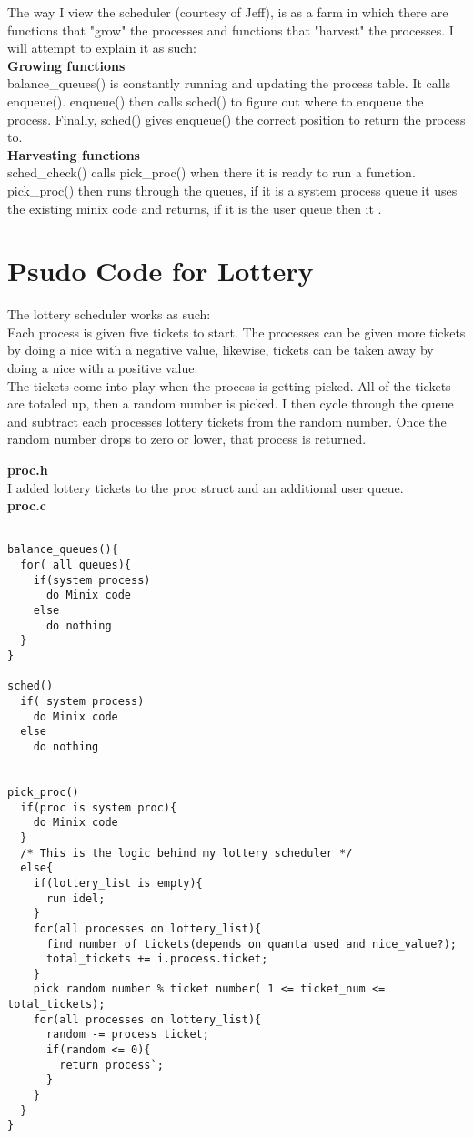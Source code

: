 \documentclass[a4paper, 12pt]{article}
\begin{document}
The way I view the scheduler (courtesy of Jeff), is as a farm in which there are functions that "grow" the processes and functions that "harvest" the processes. I will attempt to explain it as such: \\

\noindent
{\bf Growing functions } \\
balance\_queues() is constantly running and updating the process table. It calls enqueue(). enqueue() then calls sched() to figure out where to enqueue the process. Finally, sched() gives enqueue() the correct position to return the process to. \\


\noindent
{\bf Harvesting functions} \\
sched\_check() calls pick\_proc() when there it is ready to run a function. pick\_proc() then runs through the queues, if it is a system process queue it uses the existing minix code and returns, if it is the user queue then it . \\


\section{Psudo Code for Lottery}
The lottery scheduler works as such: \\
Each process is given five tickets to start. The processes can be given more tickets by doing a nice with a negative value, likewise, tickets can be taken away by doing a nice with a positive value.\\
The tickets come into play when the process is getting picked. All of the tickets are totaled up, then a random number is picked. I then cycle through the queue and subtract each processes lottery tickets from the random number. Once the random number drops to zero or lower, that process is returned.

{\bf proc.h} \\
I added lottery tickets to the proc struct and an additional user queue. \\

\noindent
{\bf proc.c} \\
\begin{verbatim}

balance_queues(){
  for( all queues){
    if(system process)
      do Minix code
    else
      do nothing
  }
}

sched()
  if( system process)
    do Minix code
  else
    do nothing


pick_proc()
  if(proc is system proc){
    do Minix code
  }
  /* This is the logic behind my lottery scheduler */
  else{
    if(lottery_list is empty){
      run idel;
    }
    for(all processes on lottery_list){
      find number of tickets(depends on quanta used and nice_value?);
      total_tickets += i.process.ticket;
    }
    pick random number % ticket number( 1 <= ticket_num <= total_tickets);
    for(all processes on lottery_list){
      random -= process ticket;
      if(random <= 0){
        return process`;
      }
    }
  }
}
\end{verbatim}
\end{document}
